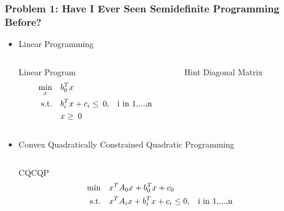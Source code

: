 \documentclass[11pt]{beamer}
\begin{document}
	\begin{frame}
		\frametitle{Problem 1: \newline Have I Ever Seen Semidefinite Programming Before?}
		\begin{itemize}[leftmargin=-0.3cm]
		\item Linear Programming\\
		\begin{columns}
			\begin{column}{0.5\textwidth}
				\begin{block}{Linear Program}
					\scriptsize
					\abovedisplayskip=0pt
					\abovedisplayshortskip=0pt 
					\belowdisplayskip=0pt
					\belowdisplayshortskip=0pt 
					\begin{equation*}
					\begin{aligned}
					\min_x\quad & b_0^Tx\quad\\
					\text{s.t.}\quad & b_i^Tx+c_i\leq  \:0\text{,\quad i in 1,...,n}\\
					 &x\geq \:0
					\end{aligned}
					\end{equation*}
				\end{block}
			\end{column}
			\begin{column}{0.5\textwidth}
				\begin{block}{Hint}
					\vspace{3.7ex}
					Diagonal Matrix
					\vspace{3.7ex}
				\end{block}
			\end{column}
		\end{columns}
		\item Convex Quadratically Constrained Quadratic Programming\\
		\begin{columns}
		\begin{column}{0.5\textwidth}
		\begin{block}{CQCQP}
		\scriptsize
		\abovedisplayskip=0pt
		\abovedisplayshortskip=0pt 
		\belowdisplayskip=0pt
		\belowdisplayshortskip=0pt
		\vspace{4ex} 
		\begin{equation*}
		\begin{aligned}
		\min\quad &x^TA_0x+b_0^Tx+c_0\\
		\text{s.t.}\quad &x^TA_ix+b_i^Tx+c_i\leq 0\text{,\quad i in 1,...,n}
		\end{aligned}
		\end{equation*}

\end{block}
\end{column}
\end{columns}
\end{itemize}
\end{frame}
\end{document}
